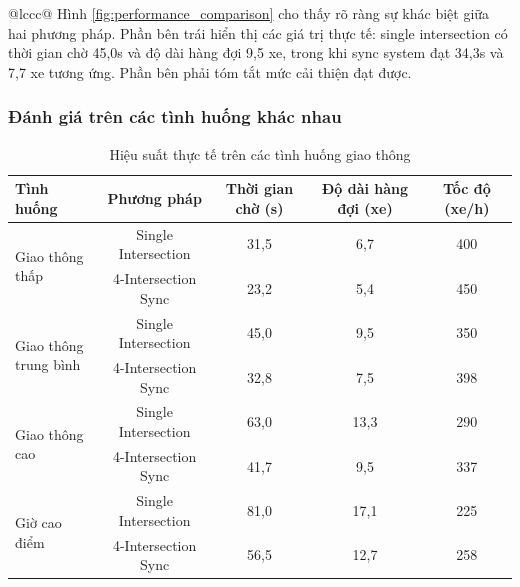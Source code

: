 \begin{table}[!htp]
\begin{tabular}{@{}lccc@{}}
Hình \ref{fig:performance_comparison} cho thấy rõ ràng sự khác biệt giữa hai 
phương pháp. Phần bên trái hiển thị các giá trị thực tế: single intersection 
có thời gian chờ 45,0s và độ dài hàng đợi 9,5 xe, trong khi sync system đạt 34,3s 
và 7,7 xe tương ứng. Phần bên phải tóm tắt mức cải thiện đạt được.

\subsubsection{Đánh giá trên các tình huống khác nhau}

\begin{table}[!htp]
    \centering
    \caption{Hiệu suất thực tế trên các tình huống giao thông}
    \label{tab:sync_scenarios_actual}
    \begin{tabular}{@{}lcccc@{}}
        \toprule \textbf{Tình huống} & \textbf{Phương pháp} & \textbf{Thời gian chờ (s)} & \textbf{Độ dài hàng đợi (xe)} & \textbf{Tốc độ (xe/h)} \\
        \midrule 
        \multirow{2}{*}{Giao thông thấp} & Single Intersection & 31,5 & 6,7 & 400 \\
        & 4-Intersection Sync & 23,2 & 5,4 & 450 \\
        \midrule
        \multirow{2}{*}{\parbox{2cm}{\centering Giao thông \\ trung bình}} & Single Intersection & 45,0 & 9,5 & 350 \\
        & 4-Intersection Sync & 32,8 & 7,5 & 398 \\
        \midrule
        \multirow{2}{*}{Giao thông cao} & Single Intersection & 63,0 & 13,3 & 290 \\
        & 4-Intersection Sync & 41,7 & 9,5 & 337 \\
        \midrule
        \multirow{2}{*}{Giờ cao điểm} & Single Intersection & 81,0 & 17,1 & 225 \\
        & 4-Intersection Sync & 56,5 & 12,7 & 258 \\
        \bottomrule
    \end{tabular}
\end{table}


\end{tabular}
\end{table}
